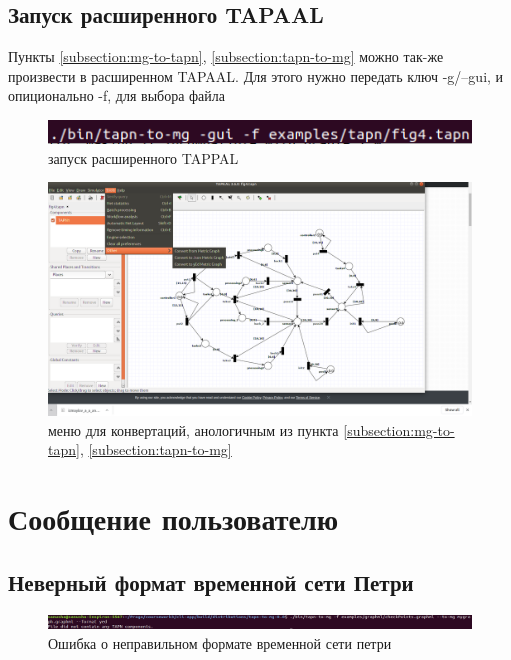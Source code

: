 \documentclass{../TechDoc}
\begin{document}
		\subsection{Запуск расширенного TAPAAL}
		Пункты \ref{subsection:mg-to-tapn}, \ref{subsection:tapn-to-mg} можно так-же произвести в расширенном TAPAAL. Для этого нужно передать ключ -g/--gui, и опиционально -f, для выбора файла
		\begin{figure}[h!]
			\centering
			\includegraphics[width=0.7\linewidth]{tapaal-run}
			\caption{запуск расширенного TAPPAL}
			\label{fig:tapaal-run}
		\end{figure}
	
		\begin{figure}[h!]
			\centering
			\includegraphics[width=0.9\linewidth]{tapaal-menu}
			\caption{меню для конвертаций, анологичным из пункта \ref{subsection:mg-to-tapn}, \ref{subsection:tapn-to-mg}}
			\label{fig:tapaal-menu}
		\end{figure}
		
	\section{Сообщение пользователю}
		\subsection{Неверный формат временной сети Петри}
		\begin{figure}[h!]
			\centering
			\includegraphics[width=0.7\linewidth]{tapn-format}
			\caption{Ошибка о неправильном формате временной сети петри}
			\label{fig:tapn-format}
		\end{figure}
\end{document}
